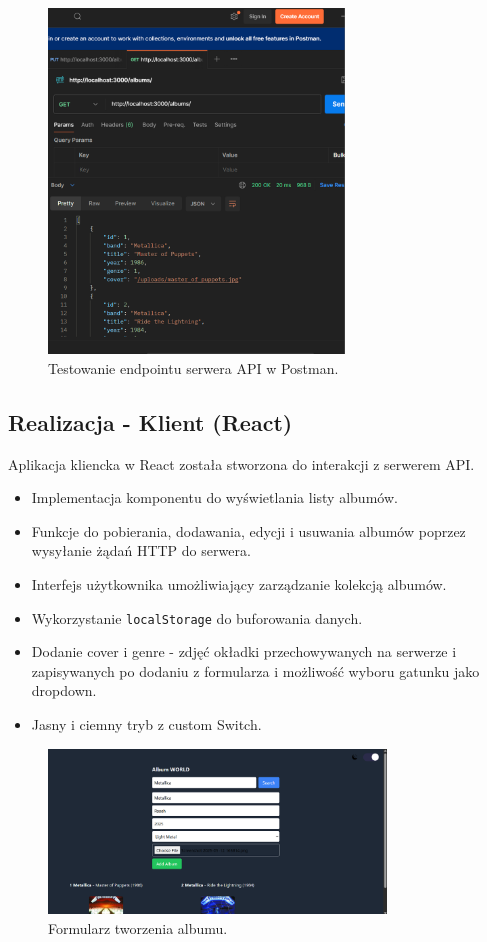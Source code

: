 \documentclass[11pt, a4paper]{article}
\begin{document}
\begin{figure}[H]
    \centering
    \includegraphics[width=0.7\textwidth]{postman.png}
    \caption{Testowanie endpointu serwera API w Postman.}
    \label{fig:serwer_test}
\end{figure}

\subsection{Realizacja - Klient (React)}
Aplikacja kliencka w React została stworzona do interakcji z serwerem API.
\begin{itemize}
    \item Implementacja komponentu do wyświetlania listy albumów.
    \item Funkcje do pobierania, dodawania, edycji i usuwania albumów poprzez wysyłanie żądań HTTP do serwera.
    \item Interfejs użytkownika umożliwiający zarządzanie kolekcją albumów.
    \item Wykorzystanie \texttt{localStorage} do buforowania danych.
    \item Dodanie cover i genre - zdjęć okładki przechowywanych na serwerze i zapisywanych po dodaniu z formularza i możliwość wyboru gatunku jako dropdown. 
    \item Jasny i ciemny tryb z custom Switch.
\end{itemize}

\begin{figure}[H]
    \centering
    \includegraphics[width=0.8\textwidth]{album-main.png}
    \caption{Formularz tworzenia albumu.}
\end{figure}
\end{document}
